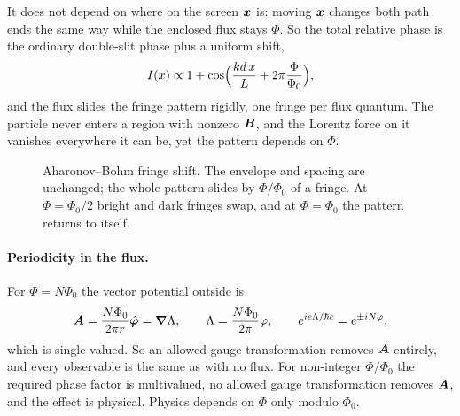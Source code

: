 It does not depend on where on the screen $\bm{x}$ is: moving $\bm{x}$ changes both path ends the same way while the enclosed flux stays $\Phi$. So the total relative phase is the ordinary double-slit phase plus a uniform shift,
\[
    I(x)\propto1 + \cos\Bigl(\frac{kd\,x}{L} + 2\pi\frac{\Phi}{\Phi_0}\Bigr),
\]
and the flux slides the fringe pattern rigidly, one fringe per flux quantum. The particle never enters a region with nonzero $\vect{B}$, and the Lorentz force on it vanishes everywhere it can be, yet the pattern depends on $\Phi$.


\begin{figure}[ht]
\centering
{}
\caption{Aharonov--Bohm fringe shift. The envelope and spacing are unchanged; the whole pattern slides by $\Phi/\Phi_0$ of a fringe. At $\Phi=\Phi_0/2$ bright and dark fringes swap, and at $\Phi=\Phi_0$ the pattern returns to itself.}
\label{fig:ab-fringes}
\end{figure}

\paragraph{Periodicity in the flux.} For $\Phi = N\Phi_0$ the vector potential outside is
\[
    \vect{A} = \frac{N\Phi_0}{2\pi r}\hat{\bm{\varphi}} = \grad\Lambda,
    \qquad
    \Lambda = \frac{N\Phi_0}{2\pi}\varphi,
    \qquad
    e^{ie\Lambda/\hbar c} = e^{\pm iN\varphi},
\]
which is single-valued. So an allowed gauge transformation removes $\vect{A}$ entirely, and every observable is the same as with no flux. For non-integer $\Phi/\Phi_0$ the required phase factor is multivalued, no allowed gauge transformation removes $\vect{A}$, and the effect is physical. Physics depends on $\Phi$ only modulo $\Phi_0$.


